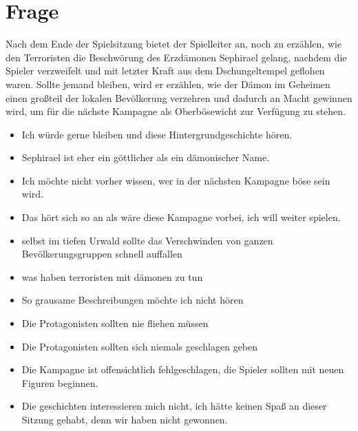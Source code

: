 \documentclass{article}
\newcommand\frage[1]{\section{Frage}\label{#1}}
\begin{document}
\frage{closure}
Nach dem Ende der Spielsitzung bietet der Spielleiter an, noch zu erzählen, wie den Terroristen die Beschwörung des Erzdämonen Sephirael gelang, nachdem die Spieler verzweifelt und mit letzter Kraft aus dem Dschungeltempel geflohen waren. Sollte jemand bleiben, wird er erzählen, wie der Dämon im Geheimen einen großteil der lokalen Bevölkerung verzehren und dadurch an Macht gewinnen wird, um für die nächste Kampagne als Oberbösewicht zur Verfügung zu stehen.
\begin{itemize}
\item Ich würde gerne bleiben und diese Hintergrundgeschichte hören.
\item Sephirael ist eher ein göttlicher als ein dämonischer Name.
\item Ich möchte nicht vorher wissen, wer in der nächsten Kampagne böse sein wird.
\item Das hört sich so an als wäre diese Kampagne vorbei, ich will weiter spielen.
\item selbst im tiefen Urwald sollte das Verschwinden von ganzen Bevölkerungsgruppen schnell auffallen
\item was haben terroristen mit dämonen zu tun
\item So grausame Beschreibungen möchte ich nicht hören
\item Die Protagonisten sollten nie fliehen müssen
\item Die Protagonisten sollten sich niemals geschlagen geben
\item Die Kampagne ist offensichtlich fehlgeschlagen, die Spieler sollten mit neuen Figuren beginnen.
\item Die geschichten interessieren mich nicht, ich hätte keinen Spaß an dieser Sitzung gehabt, denn wir haben nicht gewonnen.
\end{itemize}
\end{document}
